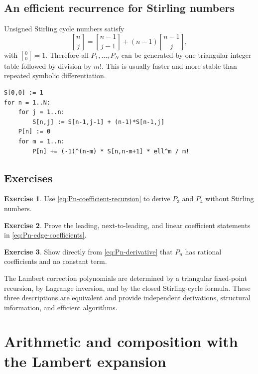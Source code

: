 \documentclass[11pt,openany]{book}
\theoremstyle{definition}
\newtheorem{exercise}{Exercise}[chapter]
\theoremstyle{plain}
\theoremstyle{remark}
\newcommand{\stirlingone}[2]{\genfrac{[}{]}{0pt}{}{#1}{#2}}
\begin{document}
\section{An efficient recurrence for Stirling numbers}
Unsigned Stirling cycle numbers satisfy
\begin{equation}\label{eq:stirling-recurrence}
 \stirlingone{n}{j}
 =\stirlingone{n-1}{j-1}
 +(n-1)\stirlingone{n-1}{j},
\end{equation}
with \(\stirlingone{0}{0}=1\). Therefore all \(P_1,\ldots,P_N\) can be generated by one triangular integer table followed by division by \(m!\). This is usually faster and more stable than repeated symbolic differentiation.

\begin{lstlisting}[style=pseudo,caption={Generating the Lambert coefficient polynomials}]
S[0,0] := 1
for n = 1..N:
    for j = 1..n:
        S[n,j] := S[n-1,j-1] + (n-1)*S[n-1,j]
    P[n] := 0
    for m = 1..n:
        P[n] += (-1)^(n-m) * S[n,n-m+1] * ell^m / m!
\end{lstlisting}

\section{Exercises}
\begin{exercise}
Use \cref{eq:Pn-coefficient-recursion} to derive \(P_3\) and \(P_4\) without Stirling numbers.
\end{exercise}
\begin{exercise}
Prove the leading, next-to-leading, and linear coefficient statements in \cref{eq:Pn-edge-coefficients}.
\end{exercise}
\begin{exercise}
Show directly from \cref{eq:Pn-derivative} that \(P_n\) has rational coefficients and no constant term.
\end{exercise}

\begin{summarybox}
The Lambert correction polynomials are determined by a triangular fixed-point recursion, by Lagrange inversion, and by the closed Stirling-cycle formula. These three descriptions are equivalent and provide independent derivations, structural information, and efficient algorithms.
\end{summarybox}

\chapter{Arithmetic and composition with the Lambert expansion}\label{ch:W-operations}
\end{document}
